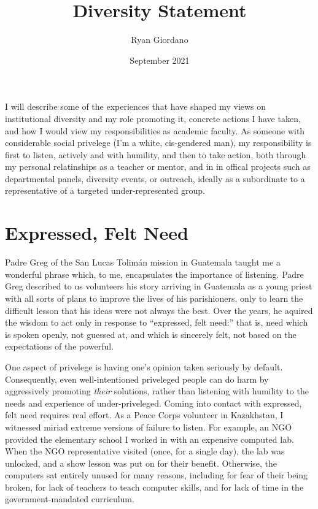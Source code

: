 \documentclass{article}
\title{Diversity Statement}
\author{Ryan Giordano}
\date{September 2021}
\begin{document}

I will describe some of the experiences that have shaped my views on
institutional diversity and my role promoting it, concrete actions I have taken,
and how I would view my responsibilities as academic faculty.  As someone with
considerable social privelege (I'm a white, cis-gendered man), my responsibility
is first to listen, actively and with humility, and then to take action, both
through my personal relatinships as a teacher or mentor, and in in offical
projects such as departmental panels, diversity events, or outreach, ideally as
a subordinate to a representative of a targeted under-represented group.


\section{Expressed, Felt Need}

Padre Greg of the San Lucas Tolimán mission in Guatemala taught me a wonderful
phrase which, to me, encapsulates the importance of listening.  Padre Greg
described to us volunteers his story arriving in Guatemala as a young priest
with all sorts of plans to improve the lives of his parishioners, only to learn
the difficult lesson that his ideas were not always the best. Over the years, he
aquired the wisdom to act only in response to ``expressed, felt need:'' that is,
need which is spoken openly, not guessed at, and which is sincerely felt, not
based on the expectations of the powerful.

One aspect of privelege is having one's opinion taken seriously by default.
Consequently, even well-intentioned priveleged people can do harm by
aggressively promoting \emph{their} solutions, rather than listening with
humility to the needs and experience of under-priveleged.  Coming into contact
with expressed, felt need requires real effort. As a Peace Corps volunteer in
Kazakhstan, I witnessed miriad extreme versions of failure to listen. For
example, an NGO provided the elementary school I worked in with an expensive
computed lab.  When the NGO representative visited (once, for a single day), the
lab was unlocked, and a show lesson was put on for their benefit.  Otherwise,
the computers sat entirely unused for many reasons, including for fear of their
being broken, for lack of teachers to teach computer skills, and for lack of
time in the government-mandated curriculum.
\end{document}
